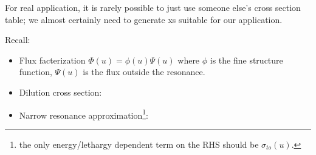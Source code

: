 \documentclass{school-22.211-notes}
\begin{document}
For real application, it is rarely possible to just use someone else's cross section table; we almost certainly need to generate xs suitable for our application. 



\clearpage
{}
Recall:
\begin{itemize}
\item Flux facterization $\Phi(u) = \phi(u) \Psi(u)$ where $\phi$ is the fine structure function, $\Psi(u)$ is the flux outside the resonance. 
\item Dilution cross section: 
\item Narrow resonance approximation\footnote{the only energy/lethargy dependent term on the RHS should be $\sigma_{to}(u)$.}:
\end{itemize}
\end{document}
